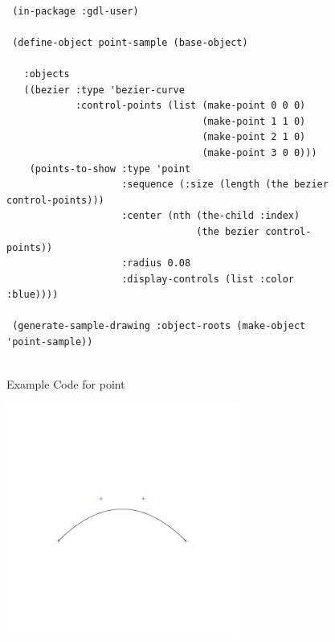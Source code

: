 \documentclass [11pt]{book}
\begin{document}
\begin{itemize}
\begin{figure}
\begin{lrbox}{\boxedverb}
\begin{minipage}{\linewidth}
{\small

\begin{verbatim}

 (in-package :gdl-user)

 (define-object point-sample (base-object)
   
   :objects
   ((bezier :type 'bezier-curve
            :control-points (list (make-point 0 0 0)
                                  (make-point 1 1 0)
                                  (make-point 2 1 0)
                                  (make-point 3 0 0)))
    (points-to-show :type 'point
                    :sequence (:size (length (the bezier control-points)))
                    :center (nth (the-child :index) 
                                 (the bezier control-points))
                    :radius 0.08
                    :display-controls (list :color :blue))))

 (generate-sample-drawing :object-roots (make-object 'point-sample))


\end{verbatim}}
\end{minipage}
\end{lrbox}
\fbox{\usebox{\boxedverb}}

\caption{Example Code for point}

\label{fig:example-code-point}

\end{figure}

\begin{figure}
\begin{center}
\includegraphics[width=3in,height=3in]{../images/example-point.pdf}
\end{center}


\end{figure}
\end{itemize}
\end{document}
